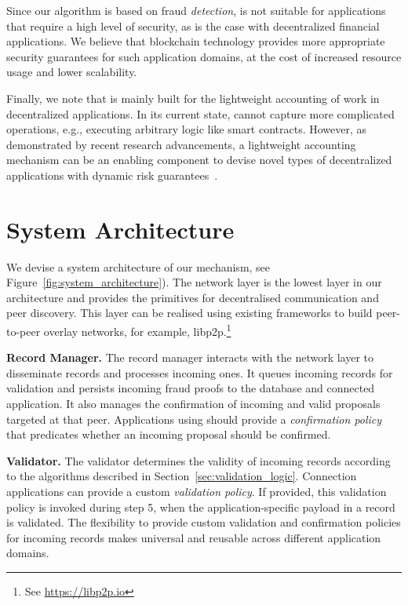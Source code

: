 Since our algorithm is based on fraud \emph{detection}, \ModelName{} is not suitable for applications that require a high level of security, as is the case with decentralized financial applications.
We believe that blockchain technology provides more appropriate security guarantees for such application domains, at the cost of increased resource usage and lower scalability.

Finally, we note that \ModelName{} is mainly built for the lightweight accounting of work in decentralized applications.
In its current state, \ModelName{} cannot capture more complicated operations, e.g., executing arbitrary logic like smart contracts.
However, as demonstrated by recent research advancements, a lightweight accounting mechanism can be an enabling component to devise novel types of decentralized applications with dynamic risk guarantees~\cite{de2020xchange,de2019devid,de2018real}.


\section{System Architecture}
\label{sec:system_architecture}
We devise a system architecture of our \ModelName{} mechanism, see Figure~\ref{fig:system_architecture}).
The network layer is the lowest layer in our architecture and provides the primitives for decentralised communication and peer discovery.
This layer can be realised using existing frameworks to build peer-to-peer overlay networks, for example, libp2p.\footnote{See \url{https://libp2p.io}}

\textbf{Record Manager.}
The record manager interacts with the network layer to disseminate records and processes incoming ones.
It queues incoming records for validation and persists incoming fraud proofs to the database and connected application.
It also manages the confirmation of incoming and valid proposals targeted at that peer.
Applications using \ModelName{} should provide a \emph{confirmation policy} that predicates whether an incoming proposal should be confirmed.

\textbf{Validator.}
The validator determines the validity of incoming records according to the algorithms described in Section~\ref{sec:validation_logic}.
Connection applications can provide a custom \emph{validation policy}.
If provided, this validation policy is invoked during step 5, when the application-specific payload in a record is validated.
The flexibility to provide custom validation and confirmation policies for incoming records makes \ModelName{} universal and reusable across different application domains.

